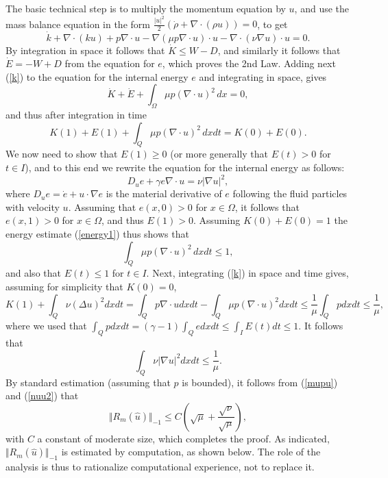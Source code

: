The basic technical step is to multiply the momentum equation
by $u$, and use the mass balance equation in the form
$\frac{\vert u\vert^2}{2}(\dot \rho +\nabla\cdot (\rho u))=0$, to get
\begin{equation}\label{k}
\dot k +\nabla\cdot (ku)+p\nabla\cdot u -
\nabla (\mu p\nabla\cdot u)\cdot u-\nabla\cdot(\nu \nabla u)\cdot u=0.
\end{equation}
By integration in space it follows that $\dot K\le W-D$,
and similarly it follows that $\dot E =-W+D$ from the 
equation for $e$, which proves the 2nd Law.
Adding next (\ref{k}) to the equation for the internal energy $e$ and
integrating in space, gives
\[
\dot K+\dot E +\int_\Omega \mu p(\nabla\cdot u)^2\, dx =0,
\]
and thus after integration in time
\begin{equation}\label{energy1}
K(1)+E(1) +\int_Q \mu p(\nabla\cdot u)^2\, dxdt =K(0)+E(0).
\end{equation}
We now need to show that $E(1)\ge 0$ (or more generally that $E(t)>0$
for $t\in I$), and to this end we
rewrite the equation for the internal energy as follows:
\[
D_ue +\gamma e\nabla\cdot u=  \nu \vert\nabla u\vert^2,
\]
where $D_ue=\dot e+u\cdot\nabla e$ is the material derivative
of $e$ following the fluid particles with velocity $u$.
 Assuming that $e(x,0)> 0$ for
$x\in\Omega $, it follows
that $e(x,1)>0$ for $x\in\Omega$, and thus $E(1)>0$.
Assuming $K(0)+E(0)=1$ the energy estimate 
(\ref{energy1}) thus shows that
\begin{equation}\label{mupu}
\int_Q\mu p(\nabla\cdot u )^2\, dxdt \le 1,
\end{equation}
and also that $E(t)\le 1$ for $t\in I$.
Next, integrating (\ref{k}) in space and time gives, assuming
for simplicity that $K(0)=0$,
\[
K(1)+\int_Q\nu (\Delta u)^2dxdt=\int_Q p\nabla\cdot udxdt -
\int_Q\mu p(\nabla\cdot u)^2dxdt \le \frac{1}{\mu}\int_Qpdxdt\le \frac{1}{\mu},
\]
where we used that $\int_Q p dxdt=(\gamma -1)\int_Qedxdt \le \int_IE(t)dt\le 1$.
It follows that
\begin{equation}\label{nuu2}
\int_Q\nu \vert\nabla u\vert^2dxdt\le \frac{1}{\mu}.
\end{equation}
By standard estimation (assuming that $p$ is bounded), 
it follows from (\ref{mupu}) and (\ref{nuu2}) that
\[
\Vert R_m(\hat u)\Vert_{-1}\le C( \sqrt{\mu}+\frac{\sqrt{\nu}}{\sqrt{\mu}}),
\]
with $C$ a constant of moderate size, which completes the proof. As indicated,
$\Vert R_m(\hat u)\Vert_{-1}$ is estimated by computation, as
shown below. The role of the analysis
is thus to rationalize computational experience, not to replace
it. 



